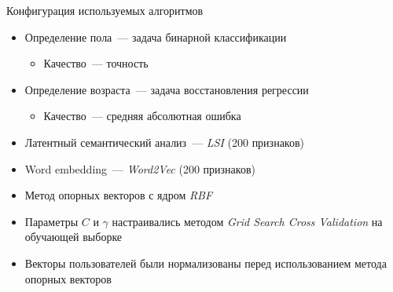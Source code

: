 \documentclass{beamer}
\begin{document}
\begin{frame}{Конфигурация используемых алгоритмов}
  \begin{itemize}
      \item {Определение пола~--- задача бинарной классификации}
          \begin{itemize}
              \item {Качество~--- точность}
          \end{itemize}
      \item {Определение возраста~--- задача восстановления регрессии}
          \begin{itemize}
              \item {Качество~--- средняя абсолютная ошибка}
          \end{itemize}
      \item {Латентный семантический анализ~--- \textit{LSI} (200 признаков)}
      \item {Word embedding~--- \textit{Word2Vec} (200 признаков)}
      \item {Метод опорных векторов с ядром \textit{RBF}}
      \item {Параметры $C$ и $\gamma$ настраивались методом \textit{Grid Search Cross Validation} на обучающей выборке}
      \item {Векторы пользователей были нормализованы перед использованием метода опорных векторов}
  \end{itemize}
\end{frame}
\end{document}
